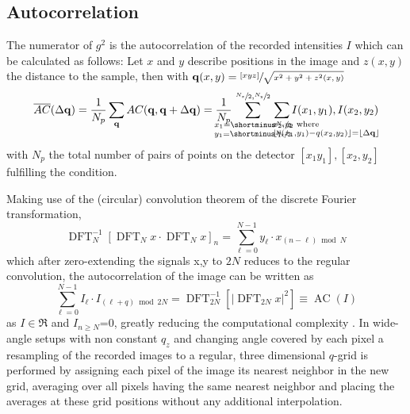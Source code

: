 \subsection{Autocorrelation}
The numerator of $g^2$ is the autocorrelation of the recorded intensities $I$ which can be calculated as follows:
Let $x$ and $y$ describe positions in the image and $z(x,y)$ the distance to the sample, then 
with $\mathbf{q}(x,y) = \sfrac{[x y z]}{\sqrt{x ^ 2 + y ^ 2 + z^2(x,y)}}$
\begin{equation}
\overline{AC}(\Delta \vec{q}) = 
\frac{1}{N_p} \sum_{\vec{q}} AC(\vec{q},\vec{q}+\Delta \vec{q})=
\frac{1}{N_p} \quad \sum^{	\crampedclap{\sfrac{N_x}{2},\sfrac{N_y}{2}}}_{
	\crampedclap{
		\begin{subarray}{l}
		x_1=\shortminus\sfrac{N_x}{2}\\
		y_1=\shortminus\sfrac{N_y}{2}
		\end{subarray}
	}}\quad
\sum_{\crampedclap{\qquad\qquad\qquad\qquad
		\begin{subarray}{l}
			x_2,y_2 \text{ where} \\ \lfloor q(x_1,y_1)-q(x_2,y_2)\rfloor=\lfloor\Delta\vec{q}\rfloor
		\end{subarray}}}
	I(x_1,y_1),I(x_2,y_2)
\end{equation}
with $N_p$ the total number of pairs of points on the detector $[x_1 y_1],[x_2,y_2]$  fulfilling the condition.

Making use of the (circular) convolution theorem of the discrete Fourier transformation,
\begin{equation}
\operatorname{DFT}_N^{-1}\left[\operatorname{DFT}_N x \cdot \operatorname{DFT}_N x\right]_n=\sum_{\ell=0}^{N-1} y_{\ell} \cdot x_{(n-\ell) \bmod N}
\end{equation}
which after zero-extending the signals x,y to $2N$ reduces to the regular convolution, the autocorrelation of the image can be written as 
\begin{equation}
\sum_{\ell=0}^{N-1} I_{\ell} \cdot I_{(\ell+q) \bmod 2N}=\operatorname{DFT}_{2N}^{-1}\left[\left|\operatorname{DFT}_{2N} {x}\right|^2\right]\equiv \operatorname{AC}(I)
\label{eq:fftcorrelation}
\end{equation} 
as $I\in \Re$ and $I_{n\geq N}$=0, greatly reducing the computational complexity \cite{oppenheim2009}. In wide-angle setups with non constant $q_z$ and changing angle covered by each pixel a resampling of the recorded images to a regular, three dimensional $q$-grid is performed by assigning each pixel of the image its nearest neighbor in the new grid, averaging over all pixels having the same nearest neighbor and placing the averages at these grid positions without any additional interpolation. 

